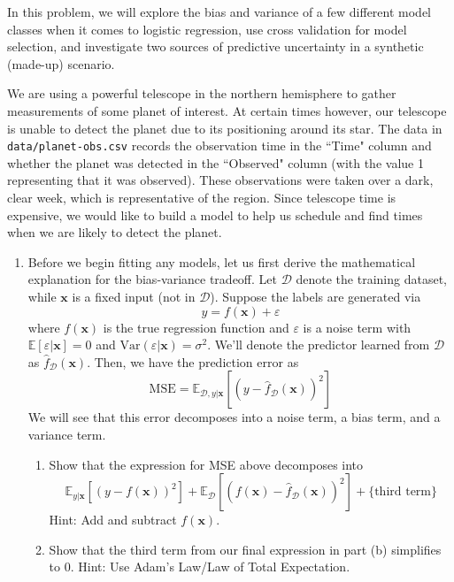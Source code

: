 \documentclass[submit]{../harvardml}
\begin{document}
\begin{problem}
In this problem, we will explore the bias and variance of a few
different model classes when it comes to logistic regression, use cross validation for model selection, and
investigate two sources of predictive uncertainty in a synthetic
(made-up) scenario.

We are using a powerful telescope in the northern hemisphere to gather
measurements of some planet of interest. At certain times however, our
telescope is unable to detect the planet due to its positioning around
its star.  The data in \verb|data/planet-obs.csv| records the
observation time in the ``Time" column and whether the planet was
detected in the ``Observed" column (with the value 1 representing that
it was observed).  These observations were taken over a dark, clear
week, which is representative of the region.  Since telescope time is
expensive, we would like to build a model to help us schedule and find
times when we are likely to detect the planet.

\begin{enumerate}
\item Before we begin fitting any models, let us first derive the mathematical explanation for the bias-variance tradeoff. Let $\mathcal{D}$ denote the training dataset, while $\mathbf{x}$ is a fixed input (not in $\mathcal{D}$). Suppose the labels are generated via $$y = f(\mathbf{x}) + \varepsilon$$ where $f(\mathbf{x})$ is the true regression function and $\varepsilon$ is a noise term with $\mathbb{E}[\varepsilon|\mathbf{x}] = 0$ and $\text{Var}(\varepsilon|\mathbf{x}) = \sigma^2$. We'll denote the predictor learned from $\mathcal{D}$ as $\hat f_\mathcal{D}(\mathbf{x})$. Then, we have the prediction error as $$\text{MSE} = \mathbb{E}_{\mathcal{D}, y|\mathbf{x}}[(y - \hat f_\mathcal{D}(\mathbf{x}))^2]$$ We will see that this error decomposes into a noise term, a bias term, and a variance term. \begin{enumerate}
    \item Show that the expression for MSE above decomposes into $$\mathbb{E}_{y|\mathbf{x}}[(y - f(\mathbf{x}))^2] + \mathbb{E}_\mathcal{D}[(f(\mathbf{x}) - \hat f_\mathcal{D}(\mathbf{x}))^2] + \text{\{third term\}}$$ Hint: Add and subtract $f(\mathbf{x})$.

    \item Show that the third term from our final expression in part (b) simplifies to 0. Hint: Use Adam's Law/Law of Total Expectation.


\end{enumerate}
\end{enumerate}
\end{problem}
\end{document}
